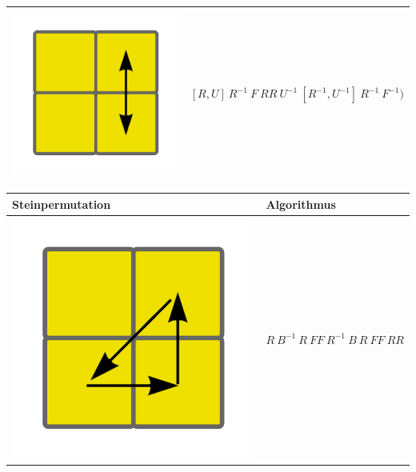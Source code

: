\documentclass[12pt,a4paper, usenames, dvipsnames]{article}
\theoremstyle{mystyle}
\theoremstyle{definition}
\begin{document}
\begin{center}
\begin{tabular}{m{4cm} m{8cm}}
\includegraphics[scale=0.08]{corners2.png}   & $[R,U] \  R^{-1} \ F \ RR \   U^{-1} \ [R^{-1}, U^{-1}] \ R^{-1} \  F^{-1})$ \\
\bottomrule
\end{tabular}
\end{center}

\begin{center}
\begin{tabular}{m{4cm} m{8cm}}
\toprule
Steinpermutation & Algorithmus  \\
\midrule
\includegraphics[scale=0.08]{corners3.png}   & $R \ B^{-1} \ R \ FF \ R^{-1} \ B \ R \ FF \ RR $ \\
\bottomrule
\end{tabular}
\end{center}
\end{document}
